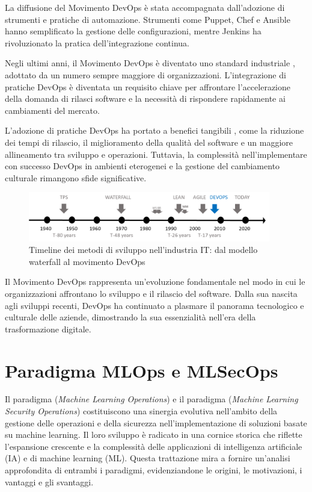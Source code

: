 La diffusione del Movimento DevOps è stata accompagnata dall'adozione di strumenti e pratiche di automazione. Strumenti come Puppet, Chef e Ansible hanno semplificato la gestione delle configurazioni, mentre Jenkins ha rivoluzionato la pratica dell'integrazione continua.

Negli ultimi anni, il Movimento DevOps è diventato uno standard industriale \cite{devops_1}, adottato da un numero sempre maggiore di organizzazioni. L'integrazione di pratiche DevOps è diventata un requisito chiave per affrontare l'accelerazione della domanda di rilasci software e la necessità di rispondere rapidamente ai cambiamenti del mercato.

L'adozione di pratiche DevOps ha portato a benefici tangibili \cite{devops_2}, come la riduzione dei tempi di rilascio, il miglioramento della qualità del software e un maggiore allineamento tra sviluppo e operazioni. Tuttavia, la complessità nell'implementare con successo DevOps in ambienti eterogenei e la gestione del cambiamento culturale rimangono sfide significative.

\begin{figure}[h]
    \centering
    \includegraphics[width=400px]{figures/ch1/devops-timeline.png}
    \caption[Timeline dei metodi di sviluppo nell'industria IT: dal modello waterfall al movimento DevOps]{Timeline dei metodi di sviluppo nell'industria IT: dal modello waterfall al movimento DevOps}
    \label{fig:cha1:from_waterfall_to_devops}
\end{figure}

Il Movimento DevOps rappresenta un'evoluzione fondamentale nel modo in cui le organizzazioni affrontano lo sviluppo e il rilascio del software. Dalla sua nascita agli sviluppi recenti, DevOps ha continuato a plasmare il panorama tecnologico e culturale delle aziende, dimostrando la sua essenzialità nell'era della trasformazione digitale.

\section{Paradigma MLOps e MLSecOps}

Il paradigma  ({\em Machine Learning Operations}) e il paradigma  ({\em Machine Learning Security Operations}) costituiscono una sinergia evolutiva nell'ambito della gestione delle operazioni e della sicurezza nell'implementazione di soluzioni basate su machine learning. Il loro sviluppo è radicato in una cornice storica che riflette l'espansione crescente e la complessità delle applicazioni di intelligenza artificiale (IA) e di machine learning (ML). Questa trattazione mira a fornire un'analisi approfondita di entrambi i paradigmi, evidenziandone le origini, le motivazioni, i vantaggi e gli svantaggi.

